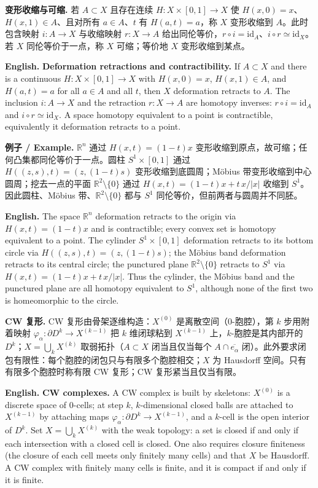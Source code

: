 \documentclass[UTF8,11pt,a4paper]{ctexart}
\newcommand{\EN}[1]{\par\noindent\textbf{English.} #1\par}
\newcommand{\EX}[2]{\par\noindent\textbf{例子 / Example.} #1\par\EN{#2}}
\begin{document}
\noindent\textbf{变形收缩与可缩.} 若 $A\subset X$ 且存在连续 $H:X\times[0,1]\to X$ 使 $H(x,0)=x$、$H(x,1)\in A$、且对所有 $a\in A$、$t$ 有 $H(a,t)=a$，称 $X$ 变形收缩到 $A$。此时包含映射 $i:A\to X$ 与收缩映射 $r:X\to A$ 给出同伦等价，$r\circ i=\mathrm{id}_A$、$i\circ r\simeq\mathrm{id}_X$。若 $X$ 同伦等价于一点，称 $X$ 可缩；等价地 $X$ 变形收缩到某点。
\EN{\textbf{Deformation retractions and contractibility.} If $A\subset X$ and there is a continuous $H:X\times[0,1]\to X$ with $H(x,0)=x$, $H(x,1)\in A$, and $H(a,t)=a$ for all $a\in A$ and all $t$, then $X$ deformation retracts to $A$. The inclusion $i:A\to X$ and the retraction $r:X\to A$ are homotopy inverses: $r\circ i=\mathrm{id}_A$ and $i\circ r\simeq\mathrm{id}_X$. A space homotopy equivalent to a point is contractible, equivalently it deformation retracts to a point.}

\EX{$\mathbb R^n$ 通过 $H(x,t)=(1-t)x$ 变形收缩到原点，故可缩；任何凸集都同伦等价于一点。圆柱 $S^1\times[0,1]$ 通过 $H((z,s),t)=(z,(1-t)s)$ 变形收缩到底圆周；M\"obius 带变形收缩到中心圆周；挖去一点的平面 $\mathbb R^2\setminus\{0\}$ 通过 $H(x,t)=(1-t)x+t\,x/|x|$ 收缩到 $S^1$。因此圆柱、M\"obius 带、$\mathbb R^2\setminus\{0\}$ 都与 $S^1$ 同伦等价，但前两者与圆周并不同胚。}{The space $\mathbb R^n$ deformation retracts to the origin via $H(x,t)=(1-t)x$ and is contractible; every convex set is homotopy equivalent to a point. The cylinder $S^1\times[0,1]$ deformation retracts to its bottom circle via $H((z,s),t)=(z,(1-t)s)$; the M\"obius band deformation retracts to its central circle; the punctured plane $\mathbb R^2\setminus\{0\}$ retracts to $S^1$ via $H(x,t)=(1-t)x+t\,x/|x|$. Thus the cylinder, the M\"obius band and the punctured plane are all homotopy equivalent to $S^1$, although none of the first two is homeomorphic to the circle.}

\noindent\textbf{CW 复形.} CW 复形由骨架逐维构造：$X^{(0)}$ 是离散空间（$0$-胞腔），第 $k$ 步用附着映射 $\varphi_\alpha:\partial D^k\to X^{(k-1)}$ 把 $k$ 维闭球粘到 $X^{(k-1)}$ 上，$k$-胞腔是其内部开的 $D^k$；$X=\bigcup_kX^{(k)}$ 取弱拓扑（$A\subset X$ 闭当且仅当每个 $A\cap\overline{e_\alpha}$ 闭）。此外要求闭包有限性：每个胞腔的闭包只与有限多个胞腔相交；$X$ 为 Hausdorff 空间。只有有限多个胞腔时称有限 CW 复形；CW 复形紧当且仅当有限。
\EN{\textbf{CW complexes.} A CW complex is built by skeletons: $X^{(0)}$ is a discrete space of $0$-cells; at step $k$, $k$-dimensional closed balls are attached to $X^{(k-1)}$ by attaching maps $\varphi_\alpha:\partial D^k\to X^{(k-1)}$, and a $k$-cell is the open interior of $D^k$. Set $X=\bigcup_kX^{(k)}$ with the weak topology: a set is closed if and only if each intersection with a closed cell is closed. One also requires closure finiteness (the closure of each cell meets only finitely many cells) and that $X$ be Hausdorff. A CW complex with finitely many cells is finite, and it is compact if and only if it is finite.}
\end{document}
